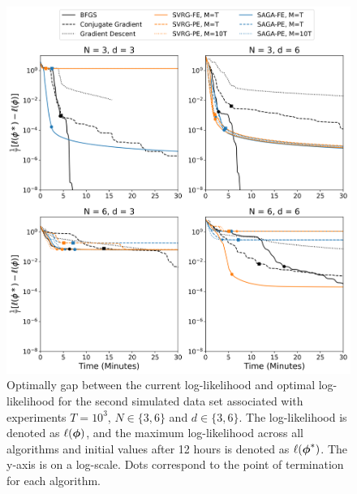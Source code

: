 \documentclass[12pt]{article}
\begin{document}
\begin{figure}[H]
    \centering
    \includegraphics[width=6.5in]{../plt/log-like_v_time_T-1000-001.png}
    \caption{Optimally gap between the current log-likelihood and optimal log-likelihood for the second simulated data set associated with experiments $T=10^{3}$, $N \in \{3,6\}$ and $d \in \{3,6\}$. The log-likelihood is denoted as $\ell(\boldsymbol{\phi})$, and the maximum log-likelihood across all algorithms and initial values after 12 hours is denoted as $\ell(\boldsymbol{\phi}^*)$. The y-axis is on a log-scale. Dots correspond to the point of termination for each algorithm.}
\end{figure}
%
\end{document}
